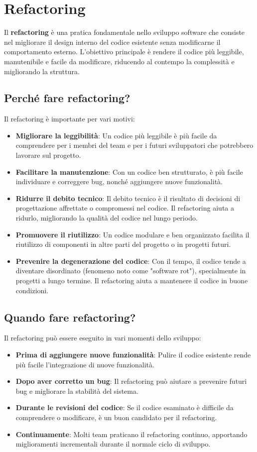 \documentclass{article}
\begin{document}
\section{Refactoring }

Il \textbf{refactoring} è una pratica fondamentale nello sviluppo software che consiste nel migliorare il design interno del codice esistente senza modificarne il comportamento esterno. L'obiettivo principale è rendere il codice più leggibile, manutenibile e facile da modificare, riducendo al contempo la complessità e migliorando la struttura.

\subsection{Perché fare refactoring?}
Il refactoring è importante per vari motivi:
\begin{itemize}
    \item \textbf{Migliorare la leggibilità}: Un codice più leggibile è più facile da comprendere per i membri del team e per i futuri sviluppatori che potrebbero lavorare sul progetto.
    \item \textbf{Facilitare la manutenzione}: Con un codice ben strutturato, è più facile individuare e correggere bug, nonché aggiungere nuove funzionalità.
    \item \textbf{Ridurre il debito tecnico}: Il debito tecnico è il risultato di decisioni di progettazione affrettate o compromessi nel codice. Il refactoring aiuta a ridurlo, migliorando la qualità del codice nel lungo periodo.
    \item \textbf{Promuovere il riutilizzo}: Un codice modulare e ben organizzato facilita il riutilizzo di componenti in altre parti del progetto o in progetti futuri.
    \item \textbf{Prevenire la degenerazione del codice}: Con il tempo, il codice tende a diventare disordinato (fenomeno noto come "software rot"), specialmente in progetti a lungo termine. Il refactoring aiuta a mantenere il codice in buone condizioni.
\end{itemize}

\subsection{Quando fare refactoring?}
Il refactoring può essere eseguito in vari momenti dello sviluppo:
\begin{itemize}
    \item \textbf{Prima di aggiungere nuove funzionalità}: Pulire il codice esistente rende più facile l'integrazione di nuove funzionalità.
    \item \textbf{Dopo aver corretto un bug}: Il refactoring può aiutare a prevenire futuri bug e migliorare la stabilità del sistema.
    \item \textbf{Durante le revisioni del codice}: Se il codice esaminato è difficile da comprendere o modificare, è un buon candidato per il refactoring.
    \item \textbf{Continuamente}: Molti team praticano il refactoring continuo, apportando miglioramenti incrementali durante il normale ciclo di sviluppo.
\end{itemize}
\end{document}
